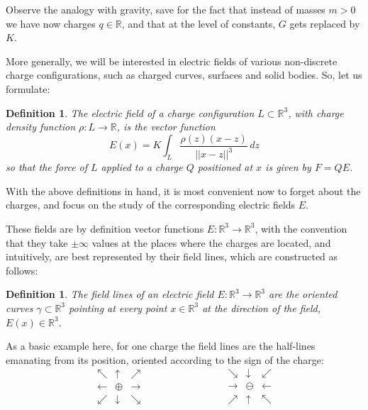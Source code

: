 \documentclass[12pt]{amsbook}
\newtheorem{definition}[theorem]{Definition}
\begin{document}
Observe the analogy with gravity, save for the fact that instead of masses $m>0$ we have now charges $q\in\mathbb R$, and that at the level of constants, $G$ gets replaced by $K$.

\bigskip

More generally, we will be interested in electric fields of various non-discrete charge configurations, such as charged curves, surfaces and solid bodies. So, let us formulate:

\begin{definition}
The electric field of a charge configuration $L\subset\mathbb R^3$, with charge density function $\rho:L\to\mathbb R$, is the vector function
$$E(x)=K\int_L\frac{\rho(z)(x-z)}{||x-z||^3}\,dz$$
so that the force of $L$ applied to a charge $Q$ positioned at $x$ is given by $F=QE$.
\end{definition}

With the above definitions in hand, it is most convenient now to forget about the charges, and focus on the study of the corresponding electric fields $E$. 

\bigskip

These fields are by definition vector functions $E:\mathbb R^3\to\mathbb R^3$, with the convention that they take $\pm\infty$ values at the places where the charges are located, and intuitively, are best represented by their field lines, which are constructed as follows:

\begin{definition}
The field lines of an electric field $E:\mathbb R^3\to\mathbb R^3$ are the oriented curves $\gamma\subset\mathbb R^3$ pointing at every point $x\in\mathbb R^3$ at the direction of the field, $E(x)\in\mathbb R^3$.
\end{definition}

As a basic example here, for one charge the field lines are the half-lines emanating from its position, oriented according to the sign of the charge:
$$\begin{matrix}
\nwarrow&\uparrow&\nearrow\\
\leftarrow&\oplus&\rightarrow\\
\swarrow&\downarrow&\searrow
\end{matrix}\qquad\qquad\qquad\qquad
\begin{matrix}
\searrow&\downarrow&\swarrow\\
\rightarrow&\ominus&\leftarrow\\
\nearrow&\uparrow&\nwarrow
\end{matrix}$$
\end{document}
